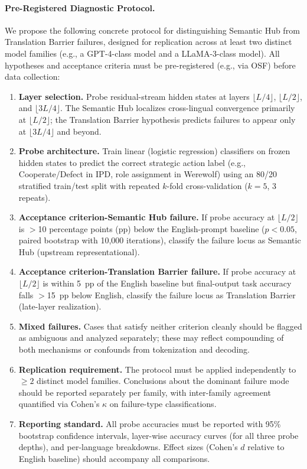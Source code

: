 \documentclass[11pt]{article}
\begin{document}
\paragraph{Pre-Registered Diagnostic Protocol.}
We propose the following concrete protocol for distinguishing Semantic Hub from Translation Barrier failures, designed for replication across at least two distinct model families (e.g., a GPT-4-class model and a LLaMA-3-class model). All hypotheses and acceptance criteria must be pre-registered (e.g., via OSF) before data collection:

\begin{enumerate}[leftmargin=1.5em,itemsep=2pt]
\item \textbf{Layer selection.} Probe residual-stream hidden states at layers $\lfloor L/4 \rfloor$, $\lfloor L/2 \rfloor$, and $\lfloor 3L/4 \rfloor$. The Semantic Hub localizes cross-lingual convergence primarily at $\lfloor L/2 \rfloor$; the Translation Barrier hypothesis predicts failures to appear only at $\lfloor 3L/4 \rfloor$ and beyond.
\item \textbf{Probe architecture.} Train linear (logistic regression) classifiers on frozen hidden states to predict the correct strategic action label (e.g., Cooperate/Defect in IPD, role assignment in Werewolf) using an 80/20 stratified train/test split with repeated $k$-fold cross-validation ($k=5$, 3 repeats).
\item \textbf{Acceptance criterion-Semantic Hub failure.} If probe accuracy at $\lfloor L/2 \rfloor$ is $>$10 percentage points (pp) below the English-prompt baseline ($p < 0.05$, paired bootstrap with 10{,}000 iterations), classify the failure locus as Semantic Hub (upstream representational).
\item \textbf{Acceptance criterion-Translation Barrier failure.} If probe accuracy at $\lfloor L/2 \rfloor$ is within 5~pp of the English baseline but final-output task accuracy falls $>$15~pp below English, classify the failure locus as Translation Barrier (late-layer realization).
\item \textbf{Mixed failures.} Cases that satisfy neither criterion cleanly should be flagged as ambiguous and analyzed separately; these may reflect compounding of both mechanisms or confounds from tokenization and decoding.
\item \textbf{Replication requirement.} The protocol must be applied independently to $\geq 2$ distinct model families. Conclusions about the dominant failure mode should be reported separately per family, with inter-family agreement quantified via Cohen's $\kappa$ on failure-type classifications.
\item \textbf{Reporting standard.} All probe accuracies must be reported with 95\% bootstrap confidence intervals, layer-wise accuracy curves (for all three probe depths), and per-language breakdowns. Effect sizes (Cohen's $d$ relative to English baseline) should accompany all comparisons.
\end{enumerate}
\end{document}
